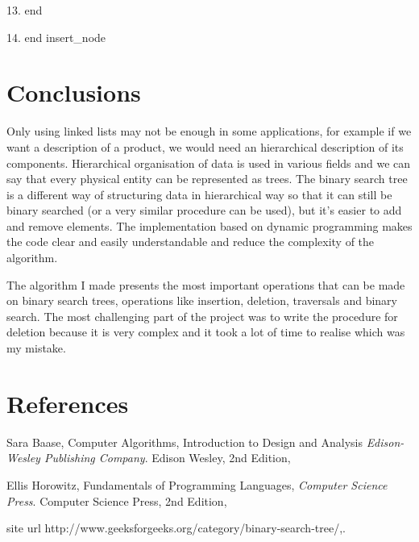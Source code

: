 \documentclass{article}
\begin{document}
13.\hspace{40pt} end

14.\hspace{30pt} end insert\_node
\section{Conclusions}
\hspace{10pt}Only using linked lists may not be enough in some applications, for example if we want a description of a product, we would need an hierarchical description of its components. Hierarchical organisation of data is used in various fields and we can say that every physical entity can be represented as trees.
The binary search tree is a different way of structuring data in hierarchical way so that it can still be binary searched (or a very similar procedure can be used), but it's easier to add and remove elements.
The implementation based on dynamic programming makes the code clear and easily understandable and reduce the complexity of the algorithm.

The algorithm I made presents the most important operations that can be made on binary search trees, operations like insertion, deletion, traversals and binary search. The most challenging part of the project was to write the procedure for deletion because it is very complex and it took a lot of time to realise which was my mistake.  

\section{References}
\begin{thebibliography}{9}

	  Sara Baase, Computer Algorithms, Introduction to Design and Analysis 
	  \emph{Edison-Wesley Publishing Company}.
	  Edison Wesley,
	  2nd Edition,
	  
	  Ellis Horowitz, Fundamentals of Programming Languages, 
	  \emph{Computer Science Press}.
	  Computer Science Press,
	  2nd Edition,

     site 
     url {http://www.geeksforgeeks.org/category/binary-search-tree/},.

\end{thebibliography}
\end{document}

